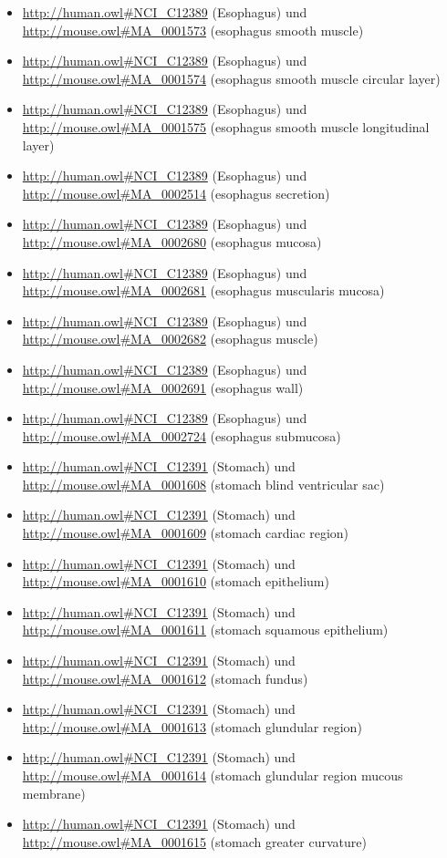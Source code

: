 \begin{itemize}
	\item \url{http://human.owl#NCI_C12389} (Esophagus) und \url{http://mouse.owl#MA_0001573} (esophagus smooth muscle)
	\item \url{http://human.owl#NCI_C12389} (Esophagus) und \url{http://mouse.owl#MA_0001574} (esophagus smooth muscle circular layer)
	\item \url{http://human.owl#NCI_C12389} (Esophagus) und \url{http://mouse.owl#MA_0001575} (esophagus smooth muscle longitudinal layer)
	\item \url{http://human.owl#NCI_C12389} (Esophagus) und \url{http://mouse.owl#MA_0002514} (esophagus secretion)
	\item \url{http://human.owl#NCI_C12389} (Esophagus) und \url{http://mouse.owl#MA_0002680} (esophagus mucosa)
	\item \url{http://human.owl#NCI_C12389} (Esophagus) und \url{http://mouse.owl#MA_0002681} (esophagus muscularis mucosa)
	\item \url{http://human.owl#NCI_C12389} (Esophagus) und \url{http://mouse.owl#MA_0002682} (esophagus muscle)
	\item \url{http://human.owl#NCI_C12389} (Esophagus) und \url{http://mouse.owl#MA_0002691} (esophagus wall)
	\item \url{http://human.owl#NCI_C12389} (Esophagus) und \url{http://mouse.owl#MA_0002724} (esophagus submucosa)
	\item \url{http://human.owl#NCI_C12391} (Stomach) und \url{http://mouse.owl#MA_0001608} (stomach blind ventricular sac)
	\item \url{http://human.owl#NCI_C12391} (Stomach) und \url{http://mouse.owl#MA_0001609} (stomach cardiac region)
	\item \url{http://human.owl#NCI_C12391} (Stomach) und \url{http://mouse.owl#MA_0001610} (stomach epithelium)
	\item \url{http://human.owl#NCI_C12391} (Stomach) und \url{http://mouse.owl#MA_0001611} (stomach squamous epithelium)
	\item \url{http://human.owl#NCI_C12391} (Stomach) und \url{http://mouse.owl#MA_0001612} (stomach fundus)
	\item \url{http://human.owl#NCI_C12391} (Stomach) und \url{http://mouse.owl#MA_0001613} (stomach glundular region)
	\item \url{http://human.owl#NCI_C12391} (Stomach) und \url{http://mouse.owl#MA_0001614} (stomach glundular region mucous membrane)
	\item \url{http://human.owl#NCI_C12391} (Stomach) und \url{http://mouse.owl#MA_0001615} (stomach greater curvature)

\end{itemize}
